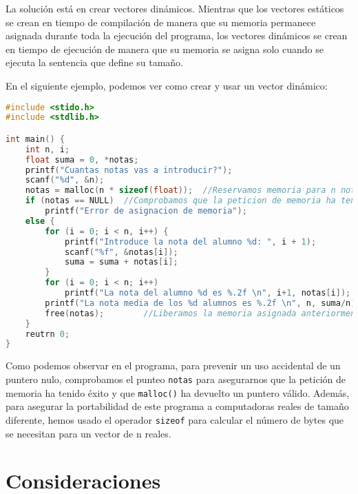 La solución está en crear vectores dinámicos. Mientras que los vectores estáticos se crean en tiempo de compilación de manera que su memoria permanece asignada durante toda la ejecución del programa, los vectores dinámicos se crean en tiempo de ejecución de manera que su memoria se asigna solo cuando se ejecuta la sentencia que define su tamaño.

En el siguiente ejemplo, podemos ver como crear y usar un vector dinámico:
\begin{Ejemplo}
\begin{lstlisting}[language=C]
#include <stido.h>
#include <stdlib.h>

int main() {
    int n, i;
    float suma = 0, *notas;
    printf("Cuantas notas vas a introducir?");
    scanf("%d", &n);
    notas = malloc(n * sizeof(float));	//Reservamos memoria para n notas
    if (notas == NULL)	//Comprobamos que la peticion de memoria ha tenido exito
        printf("Error de asignacion de memoria");
    else {
        for (i = 0; i < n, i++) {
            printf("Introduce la nota del alumno %d: ", i + 1);
            scanf("%f", &notas[i]);
            suma = suma + notas[i];
        }
        for (i = 0; i < n; i++)
            printf("La nota del alumno %d es %.2f \n", i+1, notas[i]);
        printf("La nota media de los %d alumnos es %.2f \n", n, suma/n);
        free(notas);		//Liberamos la memoria asignada anteriormente
    }
    reutrn 0;
}
\end{lstlisting}
\Explicacion
Como podemos observar en el programa, para prevenir un uso accidental de un puntero nulo, comprobamos el punteo \texttt{notas} para asegurarnos que la petición de memoria ha tenido éxito y que \texttt{malloc()} ha devuelto un puntero válido. Además, para asegurar la portabilidad de este programa a computadoras reales de tamaño diferente, hemos usado el operador \texttt{sizeof} para calcular el número de bytes que se necesitan para un vector de n reales.
\end{Ejemplo}

\section{Consideraciones}
